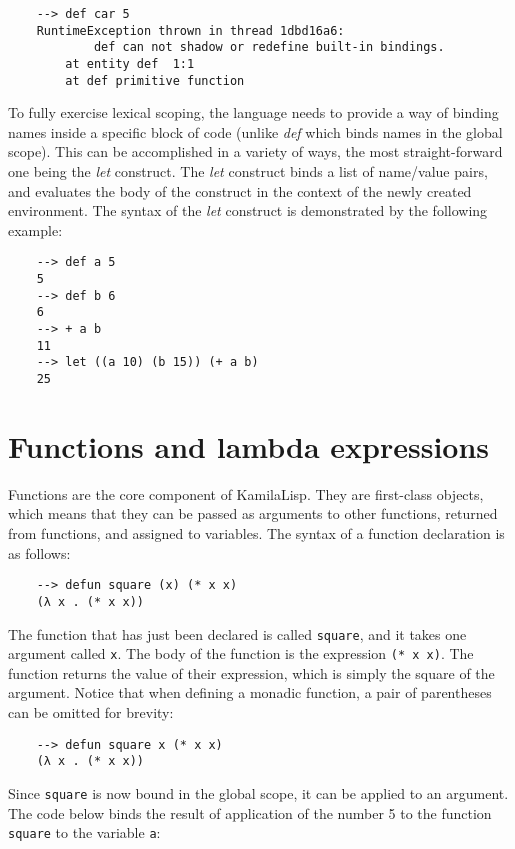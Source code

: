 \begin{Verbatim}
    --> def car 5
    RuntimeException thrown in thread 1dbd16a6:
            def can not shadow or redefine built-in bindings.
        at entity def  1:1
        at def primitive function
\end{Verbatim}

To fully exercise lexical scoping, the language needs to provide a way of binding names inside a specific block of code (unlike \textit{def} which binds names in the global scope). This can be accomplished in a variety of ways, the most straight-forward one being the \textit{let} construct. The \textit{let} construct binds a list of name/value pairs, and evaluates the body of the construct in the context of the newly created environment. The syntax of the \textit{let} construct is demonstrated by the following example:

\begin{Verbatim}
    --> def a 5
    5
    --> def b 6
    6
    --> + a b
    11
    --> let ((a 10) (b 15)) (+ a b)
    25
\end{Verbatim}

\section{Functions and lambda expressions}

Functions are the core component of KamilaLisp. They are first-class objects, which means that they can be passed as arguments to other functions, returned from functions, and assigned to variables. The syntax of a function declaration is as follows:

\begin{Verbatim}
    --> defun square (x) (* x x)
    (λ x . (* x x))
\end{Verbatim}

The function that has just been declared is called \verb|square|, and it takes one argument called \verb|x|. The body of the function is the expression \verb|(* x x)|. The function returns the value of their expression, which is simply the square of the argument. Notice that when defining a monadic function, a pair of parentheses can be omitted for brevity:

\begin{Verbatim}
    --> defun square x (* x x)
    (λ x . (* x x))
\end{Verbatim}

Since \verb|square| is now bound in the global scope, it can be applied to an argument. The code below binds the result of application of the number 5 to the function \verb|square| to the variable \verb|a|:


